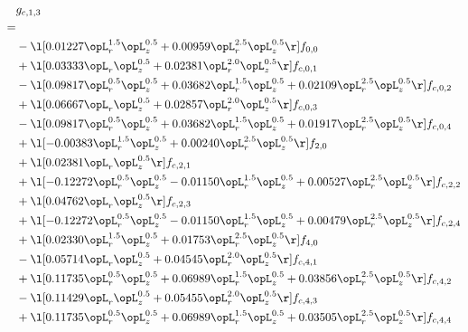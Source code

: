 \begin{alignat}{2} 
\label{eq:g_13_0} 
& g_{c,1,3} \nonumber \\ 
 = \\ 
& - \l[  0.01227 \opL_r^{1.5} \opL_z^{0.5} +  0.00959 \opL_r^{2.5} \opL_z^{0.5}  \r] f_{0,0} \nonumber \\ 
& + \l[  0.03333 \opL_r \opL_z^{0.5} +  0.02381 \opL_r^{2.0} \opL_z^{0.5}  \r] f_{c,0,1} \nonumber \\ 
& - \l[  0.09817 \opL_r^{0.5} \opL_z^{0.5} +  0.03682 \opL_r^{1.5} \opL_z^{0.5} +  0.02109 \opL_r^{2.5} \opL_z^{0.5}  \r] f_{c,0,2} \nonumber \\ 
& + \l[  0.06667 \opL_r \opL_z^{0.5} +  0.02857 \opL_r^{2.0} \opL_z^{0.5}  \r] f_{c,0,3} \nonumber \\ 
& - \l[  0.09817 \opL_r^{0.5} \opL_z^{0.5} +  0.03682 \opL_r^{1.5} \opL_z^{0.5} +  0.01917 \opL_r^{2.5} \opL_z^{0.5}  \r] f_{c,0,4} \nonumber \\ 
& + \l[  -0.00383 \opL_r^{1.5} \opL_z^{0.5} +  0.00240 \opL_r^{2.5} \opL_z^{0.5}  \r] f_{2,0} \nonumber \\ 
& + \l[  0.02381 \opL_r \opL_z^{0.5}  \r] f_{c,2,1} \nonumber \\ 
& + \l[  -0.12272 \opL_r^{0.5} \opL_z^{0.5}   -0.01150 \opL_r^{1.5} \opL_z^{0.5} +  0.00527 \opL_r^{2.5} \opL_z^{0.5}  \r] f_{c,2,2} \nonumber \\ 
& + \l[  0.04762 \opL_r \opL_z^{0.5}  \r] f_{c,2,3} \nonumber \\ 
& + \l[  -0.12272 \opL_r^{0.5} \opL_z^{0.5}   -0.01150 \opL_r^{1.5} \opL_z^{0.5} +  0.00479 \opL_r^{2.5} \opL_z^{0.5}  \r] f_{c,2,4} \nonumber \\ 
& + \l[  0.02330 \opL_r^{1.5} \opL_z^{0.5} +  0.01753 \opL_r^{2.5} \opL_z^{0.5}  \r] f_{4,0} \nonumber \\ 
& - \l[  0.05714 \opL_r \opL_z^{0.5} +  0.04545 \opL_r^{2.0} \opL_z^{0.5}  \r] f_{c,4,1} \nonumber \\ 
& + \l[  0.11735 \opL_r^{0.5} \opL_z^{0.5} +  0.06989 \opL_r^{1.5} \opL_z^{0.5} +  0.03856 \opL_r^{2.5} \opL_z^{0.5}  \r] f_{c,4,2} \nonumber \\ 
& - \l[  0.11429 \opL_r \opL_z^{0.5} +  0.05455 \opL_r^{2.0} \opL_z^{0.5}  \r] f_{c,4,3} \nonumber \\ 
& + \l[  0.11735 \opL_r^{0.5} \opL_z^{0.5} +  0.06989 \opL_r^{1.5} \opL_z^{0.5} +  0.03505 \opL_r^{2.5} \opL_z^{0.5}  \r] f_{c,4,4} \nonumber \\ 
\end{alignat} 


